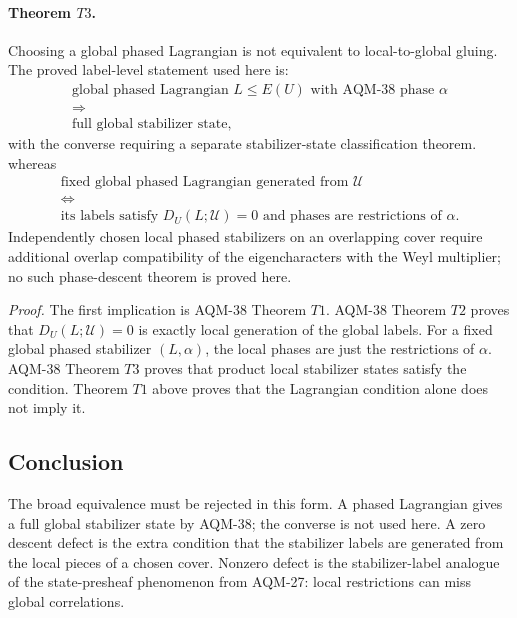 \paragraph{Theorem \(T3\).}
Choosing a global phased Lagrangian is not equivalent to local-to-global
gluing.  The proved label-level statement used here is:
\[
\begin{array}{c}
\text{global phased Lagrangian }L\leq E(U)
\text{ with AQM-38 phase }\alpha\\
\Longrightarrow\\
\text{full global stabilizer state},
\end{array}
\]
with the converse requiring a separate stabilizer-state classification theorem.
whereas
\[
\begin{array}{c}
\text{fixed global phased Lagrangian generated from }\mathcal U\\
\Longleftrightarrow\\
\text{its labels satisfy }D_U(L;\mathcal U)=0
\text{ and phases are restrictions of }\alpha .
\end{array}
\]
Independently chosen local phased stabilizers on an overlapping cover require
additional overlap compatibility of the eigencharacters with the Weyl
multiplier; no such phase-descent theorem is proved here.

\emph{Proof.}
The first implication is AQM-38 Theorem \(T1\).  AQM-38 Theorem \(T2\) proves
that \(D_U(L;\mathcal U)=0\) is exactly local generation of the global labels.
For a fixed global phased stabilizer \((L,\alpha)\), the local phases are just
the restrictions of \(\alpha\).  AQM-38 Theorem \(T3\) proves that product local
stabilizer states satisfy the condition.  Theorem \(T1\) above proves that the
Lagrangian condition alone does not imply it.

\subsection{Conclusion}

The broad equivalence must be rejected in this form.  A phased Lagrangian gives
a full global stabilizer state by AQM-38; the converse is not used here.  A
zero descent defect is the extra condition that the stabilizer labels are
generated from the local pieces of a chosen cover.  Nonzero defect is the
stabilizer-label analogue of the state-presheaf phenomenon from AQM-27: local
restrictions can miss global correlations.
